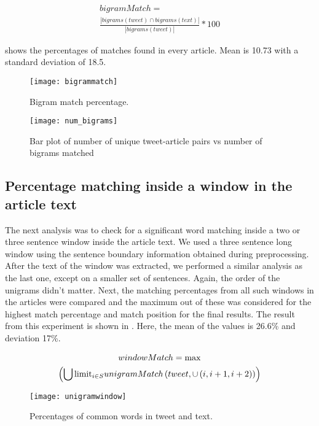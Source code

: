 \begin{multline}
bigramMatch = \\ \frac{| bigrams(tweet) \cap bigrams(text) |}{| bigrams(tweet) |} * 100
\end{multline}

 shows the percentages of matches found in every article. Mean is 10.73 with a standard deviation of 18.5.

\begin{figure}[htbp]
\centering
\texttt{[image: bigrammatch]}
\caption{Bigram match percentage.}
\label{fig:bigrammatch}
\end{figure}

\begin{figure}[htbp]
\centering
\texttt{[image: num\_bigrams]}
\caption{Bar plot of number of unique tweet-article pairs vs number of bigrams matched}
\label{fig:num_bigrams}
\end{figure}

\subsection{Percentage matching inside a window in the article text}

The next analysis was to check for a significant word matching inside a two or three sentence window inside the article text. We used a three sentence long window using the sentence boundary information obtained during preprocessing.  After the text of the window was extracted, we performed a similar analysis as the last one, except on a smaller set of sentences. Again, the order of the unigrams didn't matter. Next, the matching percentages from all such windows in the articles were compared and the maximum out of these was considered for the highest match percentage and match position for the final results. The result from this experiment is shown in . Here, the mean of the values is 26.6\% and deviation 17\%.

\begin{multline}
\displaystyle
 windowMatch = \max \\ \left(\displaystyle \bigcup \textrm{limit}_{i \in S} 
unigramMatch \left( tweet,  \cup \left( i,i+1,i+2 \right) \right)  \right)
\end{multline}
\begin{figure}[htbp]
\centering
\texttt{[image: unigramwindow]}
\caption{Percentages of common words in tweet and text.}
\label{fig:unigramwindow}
\end{figure}

